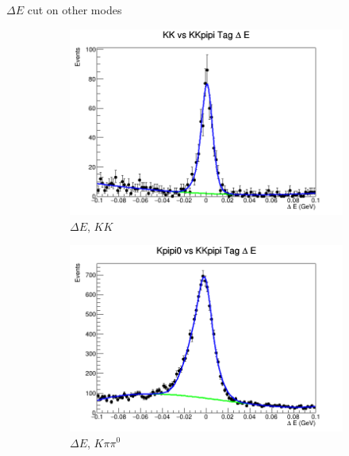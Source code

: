 \documentclass{beamer}
\begin{document}
\begin{frame}{$\Delta E$ cut on other modes}
  \begin{figure}
    \centering
    \begin{subfigure}{0.4\textwidth}
      \centering
      \includegraphics[width=\textwidth]{KKTagDeltaE.png}
      \caption{$\Delta E$, $KK$}
    \end{subfigure}%
    \begin{subfigure}{0.4\textwidth}
      \centering
      \includegraphics[width=\textwidth]{Kpipi0TagDeltaE.png}
      \caption{$\Delta E$, $K\pi\pi^0$}
    \end{subfigure}
    \centering
    \begin{subfigure}{0.4\textwidth}
      \centering

\end{subfigure}
\end{figure}
\end{frame}
\end{document}
